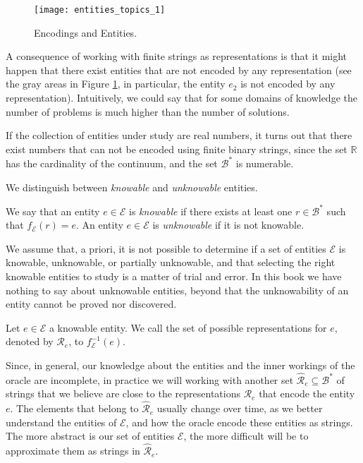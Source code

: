 \begin{figure}[h]
\centering\texttt{[image: entities\_topics\_1]}
\caption{\label{fig:entities_topics_1}Encodings and Entities.}
\end{figure}

A consequence of working with finite strings as representations is that it might happen that there exist entities that are not encoded by any representation (see the gray areas in Figure \ref{fig:entities_topics_1}, in particular, the entity $e_2$ is not encoded by any representation). Intuitively, we could say that for some domains of knowledge the number of problems is much higher than the number of solutions.

\begin{example}
If the collection of entities under study are real numbers, it turns out that there exist numbers that can not be encoded using finite binary strings, since the set $\mathbb{R}$ has the cardinality of the continuum, and the set $\mathcal{B}^\ast$ is numerable.
\end{example}

We distinguish between \emph{knowable} and \emph{unknowable} entities.

\begin{definition}
We say that an entity $e \in \mathcal{E}$ is \emph{knowable} if there exists at least one $r \in \mathcal{B}^\ast$ such that $f_\mathcal{E}(r) = e$. An entity $e \in \mathcal{E}$ is \emph{unknowable} if it is not knowable.
\end{definition}

We assume that, a priori, it is not possible to determine if a set of entities $\mathcal{E}$ is knowable, unknowable, or partially unknowable, and that selecting the right knowable entities to study is a matter of trial and error. In this book  we have nothing to say about unknowable entities, beyond that the unknowability of an entity cannot be proved nor discovered.

\begin{definition}
Let $e \in \mathcal{E}$ a knowable entity. We call the set of possible representations for $e$, denoted by $\mathcal{R}_e$, to $f_\mathcal{E}^{-1} (e)$.
\end{definition}

Since, in general, our knowledge about the entities and the inner workings of the oracle are incomplete, in practice we will working with another set $\hat{\mathcal{R}}_e \subseteq \mathcal{B}^\ast$ of strings that we believe are close to the representations $\mathcal{R}_e$ that encode the entity $e$. The elements that belong to $\hat{\mathcal{R}}_e$ usually change over time, as we better understand the entities of $\mathcal{E}$, and how the oracle encode these entities as strings. The more abstract is our set of entities $\mathcal{E}$, the more difficult will be to approximate them as strings in $\hat{\mathcal{R}}_e$.

